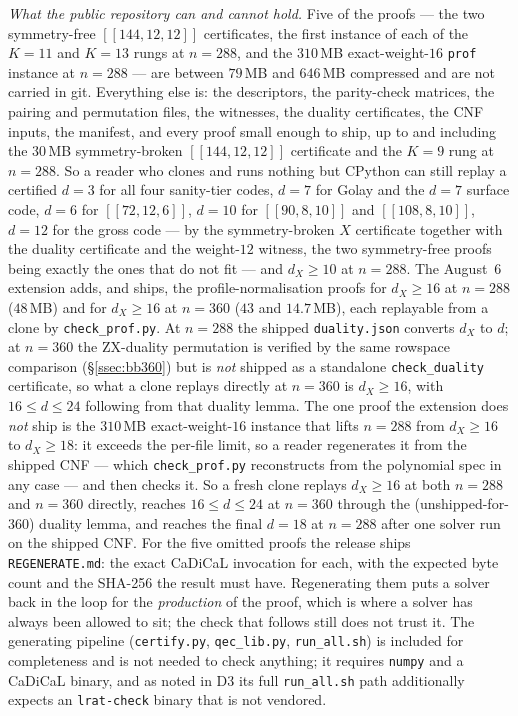 \documentclass[11pt]{amsart}
\newcommand{\dX}{d_{X}}
\newcommand{\gross}{[[144,12,12]]}
\theoremstyle{plain}
\theoremstyle{definition}
\theoremstyle{remark}
\begin{document}
\smallskip
\noindent\emph{What the public repository can and cannot hold.} Five of the
proofs --- the two symmetry-free $\gross$ certificates, the first instance of
each of the $K=11$ and $K=13$ rungs at $n=288$, and the $310$\,MB
exact-weight-$16$ \texttt{prof} instance at $n=288$ --- are between $79$\,MB and
$646$\,MB compressed and are not carried in git. Everything else is: the
descriptors, the parity-check matrices, the pairing and permutation files, the
witnesses, the duality certificates, the CNF inputs, the manifest, and every
proof small enough to ship, up to and including the $30$\,MB symmetry-broken
$\gross$ certificate and the $K=9$ rung at $n=288$. So a reader who clones and
runs nothing but CPython can still replay a certified $d=3$ for all four
sanity-tier codes, $d=7$ for Golay and the $d{=}7$ surface code, $d=6$ for
$[[72,12,6]]$, $d=10$ for $[[90,8,10]]$ and $[[108,8,10]]$, $d=12$ for the
gross code --- by the symmetry-broken $X$ certificate together with the
duality certificate and the weight-$12$ witness, the two symmetry-free proofs
being exactly the ones that do not fit --- and $\dX\ge10$ at $n=288$. The
August~6 extension adds, and ships, the profile-normalisation proofs for
$\dX\ge16$ at $n=288$ ($48$\,MB) and for $\dX\ge16$ at $n=360$ ($43$ and
$14.7$\,MB), each replayable from a clone by \texttt{check\_prof.py}. At $n=288$
the shipped \texttt{duality.json} converts $\dX$ to $d$; at $n=360$ the
ZX-duality permutation is verified by the same rowspace comparison
(\S\ref{ssec:bb360}) but is \emph{not} shipped as a standalone
\texttt{check\_duality} certificate, so what a clone replays directly at $n=360$
is $\dX\ge16$, with $16\le d\le24$ following from that duality lemma. The one
proof the extension does \emph{not} ship is the $310$\,MB exact-weight-$16$
instance that lifts $n=288$ from $\dX\ge16$ to $\dX\ge18$: it exceeds the
per-file limit, so a reader regenerates it from the shipped CNF --- which
\texttt{check\_prof.py} reconstructs from the polynomial spec in any case ---
and then checks it. So a fresh clone replays $\dX\ge16$ at both $n=288$ and
$n=360$ directly, reaches $16\le d\le24$ at $n=360$ through the
(unshipped-for-$360$) duality lemma, and reaches the final $d=18$ at $n=288$
after one solver run on the shipped CNF.
For the five omitted proofs the release ships \texttt{REGENERATE.md}: the exact
CaDiCaL invocation for each, with the expected byte count and the SHA-256 the
result must have. Regenerating them
puts a solver back in the loop for the \emph{production} of the proof, which
is where a solver has always been allowed to sit; the check that follows still
does not trust it. The generating pipeline
(\texttt{certify.py}, \texttt{qec\_lib.py}, \texttt{run\_all.sh}) is included
for completeness and is not needed to check anything; it requires
\texttt{numpy} and a CaDiCaL binary, and as noted in D3 its full
\texttt{run\_all.sh} path additionally expects an \texttt{lrat-check} binary
that is not vendored.
\end{document}
